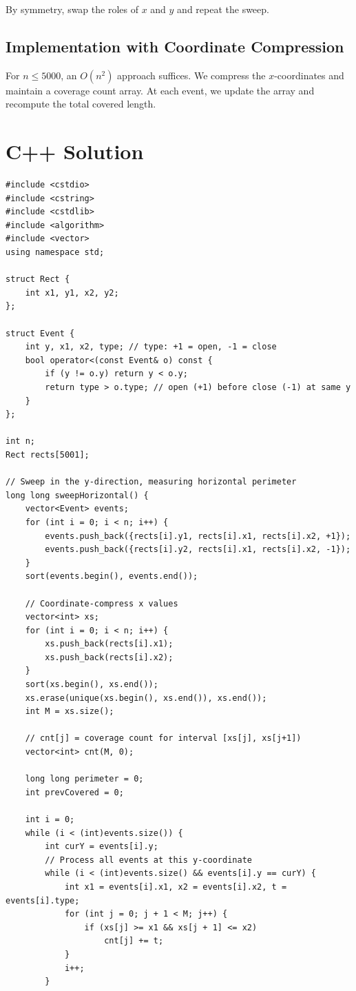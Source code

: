\documentclass[11pt,a4paper]{article}
\begin{document}
By symmetry, swap the roles of $x$ and $y$ and repeat the sweep.

\subsection{Implementation with Coordinate Compression}

For $n \le 5000$, an $O(n^2)$ approach suffices. We compress the $x$-coordinates
and maintain a coverage count array. At each event, we update the array and recompute
the total covered length.

\section{C++ Solution}

\begin{lstlisting}
#include <cstdio>
#include <cstring>
#include <cstdlib>
#include <algorithm>
#include <vector>
using namespace std;

struct Rect {
    int x1, y1, x2, y2;
};

struct Event {
    int y, x1, x2, type; // type: +1 = open, -1 = close
    bool operator<(const Event& o) const {
        if (y != o.y) return y < o.y;
        return type > o.type; // open (+1) before close (-1) at same y
    }
};

int n;
Rect rects[5001];

// Sweep in the y-direction, measuring horizontal perimeter
long long sweepHorizontal() {
    vector<Event> events;
    for (int i = 0; i < n; i++) {
        events.push_back({rects[i].y1, rects[i].x1, rects[i].x2, +1});
        events.push_back({rects[i].y2, rects[i].x1, rects[i].x2, -1});
    }
    sort(events.begin(), events.end());

    // Coordinate-compress x values
    vector<int> xs;
    for (int i = 0; i < n; i++) {
        xs.push_back(rects[i].x1);
        xs.push_back(rects[i].x2);
    }
    sort(xs.begin(), xs.end());
    xs.erase(unique(xs.begin(), xs.end()), xs.end());
    int M = xs.size();

    // cnt[j] = coverage count for interval [xs[j], xs[j+1])
    vector<int> cnt(M, 0);

    long long perimeter = 0;
    int prevCovered = 0;

    int i = 0;
    while (i < (int)events.size()) {
        int curY = events[i].y;
        // Process all events at this y-coordinate
        while (i < (int)events.size() && events[i].y == curY) {
            int x1 = events[i].x1, x2 = events[i].x2, t = events[i].type;
            for (int j = 0; j + 1 < M; j++) {
                if (xs[j] >= x1 && xs[j + 1] <= x2)
                    cnt[j] += t;
            }
            i++;
        }


\end{lstlisting}
\end{document}
